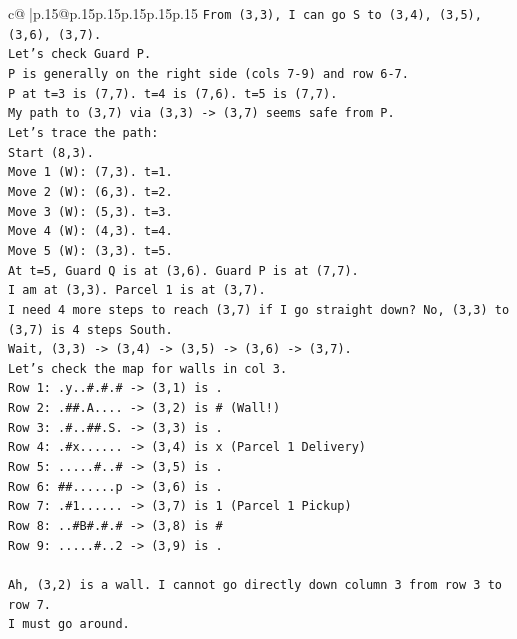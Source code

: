 \documentclass{article}
\begin{document}
{\begin{supertabular}{c@{$\;$}|p{.15\linewidth}@{}p{.15\linewidth}p{.15\linewidth}p{.15\linewidth}p{.15\linewidth}p{.15\linewidth}}
{{{\texttt{From (3,3), I can go S to (3,4), (3,5), (3,6), (3,7).} \\
\texttt{Let's check Guard P.} \\
\texttt{P is generally on the right side (cols 7{-}9) and row 6{-}7.} \\
\texttt{P at t=3 is (7,7). t=4 is (7,6). t=5 is (7,7).} \\
\texttt{My path to (3,7) via (3,3) {-}> (3,7) seems safe from P.} \\
\texttt{Let's trace the path:} \\
\texttt{Start (8,3).} \\
\texttt{Move 1 (W): (7,3). t=1.} \\
\texttt{Move 2 (W): (6,3). t=2.} \\
\texttt{Move 3 (W): (5,3). t=3.} \\
\texttt{Move 4 (W): (4,3). t=4.} \\
\texttt{Move 5 (W): (3,3). t=5.} \\
\texttt{At t=5, Guard Q is at (3,6). Guard P is at (7,7).} \\
\texttt{I am at (3,3). Parcel 1 is at (3,7).} \\
\texttt{I need 4 more steps to reach (3,7) if I go straight down? No, (3,3) to (3,7) is 4 steps South.} \\
\texttt{Wait, (3,3) {-}> (3,4) {-}> (3,5) {-}> (3,6) {-}> (3,7).} \\
\texttt{Let's check the map for walls in col 3.} \\
\texttt{Row 1: .y..\#.\#.\# {-}> (3,1) is .} \\
\texttt{Row 2: .\#\#.A.... {-}> (3,2) is \# (Wall!)} \\
\texttt{Row 3: .\#..\#\#.S. {-}> (3,3) is .} \\
\texttt{Row 4: .\#x...... {-}> (3,4) is x (Parcel 1 Delivery)} \\
\texttt{Row 5: .....\#..\# {-}> (3,5) is .} \\
\texttt{Row 6: \#\#......p {-}> (3,6) is .} \\
\texttt{Row 7: .\#1...... {-}> (3,7) is 1 (Parcel 1 Pickup)} \\
\texttt{Row 8: ..\#B\#.\#.\# {-}> (3,8) is \#} \\
\texttt{Row 9: .....\#..2 {-}> (3,9) is .} \\
\\ 
\texttt{Ah, (3,2) is a wall. I cannot go directly down column 3 from row 3 to row 7.} \\
\texttt{I must go around.} \\
}}}
\end{supertabular}}
\end{document}
